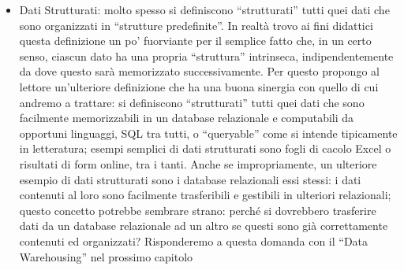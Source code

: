 \documentclass[a4paper,12pt]{report}
\begin{document}
\begin{itemize}
    \item Dati Strutturati: molto spesso si definiscono “strutturati” tutti quei dati che sono organizzati in “strutture predefinite”. In realtà trovo ai fini didattici questa definizione un po’ fuorviante per il semplice fatto che, in un certo senso, ciascun dato ha una propria “struttura” intrinseca, indipendentemente da dove questo sarà memorizzato successivamente. Per questo propongo al lettore un’ulteriore definizione che ha una buona sinergia con quello di cui andremo a trattare: si definiscono “strutturati” tutti quei dati che sono facilmente memorizzabili in un database relazionale e computabili da opportuni linguaggi, SQL tra tutti, o “queryable” come si intende tipicamente in letteratura; esempi semplici di dati strutturati sono fogli di cacolo Excel o risultati di form online, tra i tanti. Anche se impropriamente, un ulteriore esempio di dati strutturati sono i database relazionali essi stessi: i dati contenuti al loro sono facilmente trasferibili e gestibili in ulteriori relazionali; questo concetto potrebbe sembrare strano: perché si dovrebbero trasferire dati da un database relazionale ad un altro se questi sono già correttamente contenuti ed organizzati? Risponderemo a questa domanda con il “Data Warehousing” nel prossimo capitolo

\end{itemize}
\end{document}

